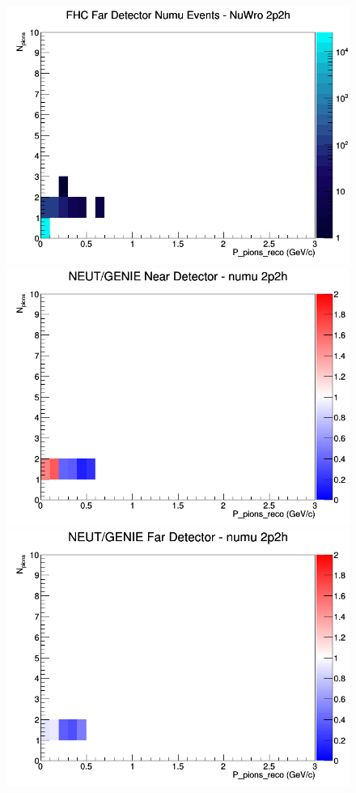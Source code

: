 \documentclass[12pt]{article}
\begin{document}
\begin{figure}[h]
\endminipage
{}
\includegraphics[width=\linewidth]{eff_N_P/FGT/pions/2p2h_FHC_FD_numu_N_P_NuWro.png}
\endminipage
\newline
{}
\includegraphics[width=\linewidth]{eff_N_P/FGT/pions/ratios/2p2h_NEUT_GENIE_numu_near_N_P.png}
\endminipage
{}
\includegraphics[width=\linewidth]{eff_N_P/FGT/pions/ratios/2p2h_NEUT_GENIE_numu_far_N_P.png}

\end{figure}
\end{document}
